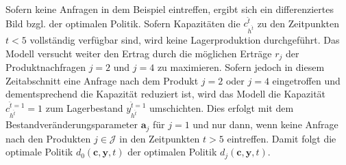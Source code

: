 Sofern keine Anfragen in dem Beispiel eintreffen, ergibt sich ein differenziertes Bild bzgl. der optimalen Politik. Sofern Kapazitäten die $c_{h^{\hat t}}^{\hat t}$ zu den Zeitpunkten $t<5$ vollständig verfügbar sind, wird keine Lagerproduktion durchgeführt. Das Modell versucht weiter den Ertrag durch die möglichen Erträge $r_j$ der Produktnachfragen $j=2$ und $j=4$ zu maximieren. Sofern jedoch in diesem Zeitabschnitt eine Anfrage nach dem Produkt $j=2$ oder $j=4$ eingetroffen und dementsprechend die Kapazität reduziert ist, wird das Modell die Kapazität $c_{h^{\hat t}}^{\hat t=1}=1$ zum Lagerbestand $y_{h^{\hat t}}^{\hat t=1}$ umschichten. Dies erfolgt mit dem Bestandveränderungsparameter $\textbf{a}_j$ für $j=1$ und nur dann, wenn keine Anfrage nach den Produkten $j\in\mathcal{J}$ in den Zeitpunkten $t>5$ eintreffen. Damit folgt die optimale Politik $d_{0}({\textbf{c},\textbf{y}, t})$ der optimalen Politik $d_{j}({\textbf{c},\textbf{y}, t})$.



